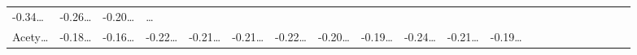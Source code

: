 \documentclass[
]{article}
\begin{document}
\begin{longtable}[]{@{}lllllllllllllllllllll@{}}
\begin{minipage}[t]{0.03\columnwidth}
-0.34\ldots{}\strut
\end{minipage} & \begin{minipage}[t]{0.03\columnwidth}\raggedright
-0.26\ldots{}\strut
\end{minipage} & \begin{minipage}[t]{0.03\columnwidth}\raggedright
-0.20\ldots{}\strut
\end{minipage} & \begin{minipage}[t]{0.01\columnwidth}\raggedright
\ldots{}\strut
\end{minipage}\tabularnewline
\begin{minipage}[t]{0.03\columnwidth}\raggedright
Acety\ldots{}\strut
\end{minipage} & \begin{minipage}[t]{0.03\columnwidth}\raggedright
-0.18\ldots{}\strut
\end{minipage} & \begin{minipage}[t]{0.03\columnwidth}\raggedright
-0.16\ldots{}\strut
\end{minipage} & \begin{minipage}[t]{0.03\columnwidth}\raggedright
-0.22\ldots{}\strut
\end{minipage} & \begin{minipage}[t]{0.03\columnwidth}\raggedright
-0.21\ldots{}\strut
\end{minipage} & \begin{minipage}[t]{0.03\columnwidth}\raggedright
-0.21\ldots{}\strut
\end{minipage} & \begin{minipage}[t]{0.03\columnwidth}\raggedright
-0.22\ldots{}\strut
\end{minipage} & \begin{minipage}[t]{0.03\columnwidth}\raggedright
-0.20\ldots{}\strut
\end{minipage} & \begin{minipage}[t]{0.03\columnwidth}\raggedright
-0.19\ldots{}\strut
\end{minipage} & \begin{minipage}[t]{0.03\columnwidth}\raggedright
-0.24\ldots{}\strut
\end{minipage} & \begin{minipage}[t]{0.03\columnwidth}\raggedright
-0.21\ldots{}\strut
\end{minipage} & \begin{minipage}[t]{0.03\columnwidth}\raggedright
-0.19\ldots{}\strut
\end{minipage} & \begin{minipage}[t]{0.03\columnwidth}\raggedright

\end{minipage}
\end{longtable}
\end{document}
